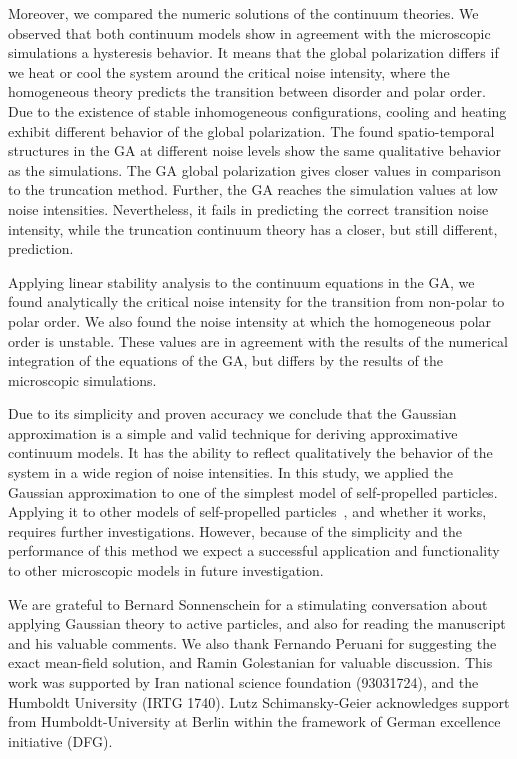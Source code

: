 \documentclass[reprint,floatfix,amsmath,amssymb,aps,pre,showkeys,showpacs,superscriptaddress]{revtex4-1}
\newcommand{\hl}[1]{\textcolor{hlcolor}{#1}}
\begin{document}
Moreover, we compared the numeric solutions of the continuum theories. We observed that both continuum models show in agreement with the microscopic simulations a hysteresis behavior. It means that the global polarization differs if we heat or cool the system around the critical noise intensity, where the homogeneous theory predicts the transition between disorder and polar order. Due to the existence of stable inhomogeneous configurations, cooling and heating exhibit different behavior of the global polarization. The found spatio-temporal structures in the GA at different noise levels show the same qualitative behavior as the simulations. The GA global polarization gives closer values in comparison to the truncation method. Further, the GA reaches the simulation values at low noise intensities. Nevertheless, it fails in predicting the correct transition noise intensity, while the truncation continuum theory has a closer, but still different, prediction.

Applying linear stability analysis to the continuum equations in the GA, we found analytically the critical noise intensity for the transition from non-polar to polar order. \hl{We also found the noise intensity at which the homogeneous polar order is unstable. These values are} in agreement with the results of the numerical integration of the equations of the GA\hl{, but differs by the results of the microscopic simulations.}

Due to its simplicity and proven accuracy we conclude that the Gaussian approximation is a simple and valid technique for deriving approximative continuum models. It has the ability to reflect qualitatively the behavior of the system in a wide region of noise intensities. \hl{In this study, we applied the Gaussian approximation to one of the simplest model of self-propelled particles. Applying it to other models of self-propelled particles~\cite{Menzel2013unidirectional,Romanczuk2016emergent,Menzel2016on,allaei2016,Chen2013universality,Adhyapak2013live}, and whether it works, requires further investigations. However, because of} the simplicity and the performance of this method \hl{we} expect a successful application and functionality to other microscopic models in future investigation.




\begin{acknowledgments}
We are grateful to Bernard Sonnenschein for a stimulating conversation about applying Gaussian theory to active particles, and also for reading the manuscript and his valuable comments. We also thank Fernando Peruani for suggesting the exact mean-field solution, and Ramin Golestanian for valuable discussion. This work was supported by Iran national science foundation (93031724), and 
the Humboldt University (IRTG 1740). Lutz Schimansky-Geier acknowledges support from Humboldt-University at Berlin within the framework of German excellence initiative (DFG).
\end{acknowledgments}
\end{document}

